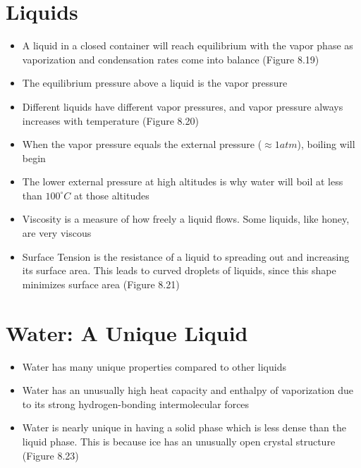 \documentclass[12pt, openany, letterpaper]{memoir}
\begin{document}
\section{Liquids}
\begin{itemize}
	\item A liquid in a closed container will reach equilibrium with the vapor phase as vaporization and condensation rates come into balance (Figure 8.19)
	\item The equilibrium pressure above a liquid is the vapor pressure
	\item Different liquids have different vapor pressures, and vapor pressure always increases with temperature (Figure 8.20)
	\item When the vapor pressure equals the external pressure ($\approx 1atm$), boiling will begin
	\item The lower external pressure at high altitudes is why water will boil at less than $100^\circ C$ at those altitudes
	\item Viscosity is a measure of how freely a liquid flows. Some liquids, like honey, are very viscous
	\item Surface Tension is the resistance of a liquid to spreading out and increasing its surface area. This leads to curved droplets of liquids, since this shape minimizes surface area (Figure 8.21)
\end{itemize}

\section*{Water: A Unique Liquid}
\begin{itemize}
	\item Water has many unique properties compared to other liquids
	\item Water has an unusually high heat capacity and enthalpy of vaporization due to its strong hydrogen-bonding intermolecular forces
	\item Water is nearly unique in having a solid phase which is less dense than the liquid phase. This is because ice has an unusually open crystal structure (Figure 8.23)
\end{itemize}
\end{document}
